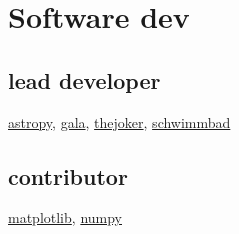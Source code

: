 \documentclass[letterpaper,12pt]{deedy-resume}
\begin{document}
\begin{minipage}[t]{0.32\textwidth}
\section{Software dev}

\subsection{lead developer}
\href{https://github.com/adrn/astropy}{astropy},
\href{https://github.com/adrn/gala}{gala},
\href{https://github.com/adrn/thejoker}{thejoker},
\href{https://github.com/adrn/schwimmbad}{schwimmbad}

\sectionspace %

\subsection{contributor}
\href{https://github.com/matplotlib/matplotlib}{matplotlib},
\href{https://github.com/numpy/numpy}{numpy}

\sectionspace %






\end{minipage} %
\hfill
%
%
\end{document}
